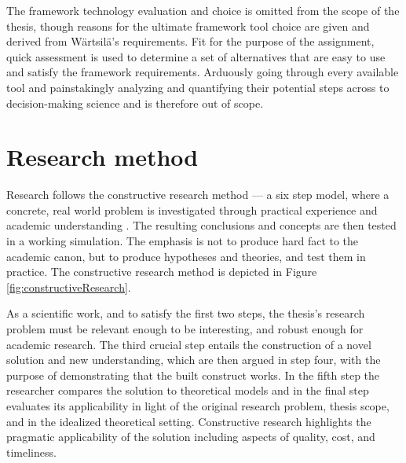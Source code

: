 \documentclass[12pt,a4paper,oneside,pdftex]{report}
\begin{document}
The framework technology evaluation and choice is omitted from the scope of the thesis, though reasons for the ultimate framework tool choice are given and derived from Wärtsilä's requirements. Fit for the purpose of the assignment, quick assessment is used to determine a set of alternatives that are easy to use and satisfy the framework requirements. Arduously going through every available tool and painstakingly analyzing and quantifying their potential steps across to decision-making science and is therefore out of scope. 


\section{Research method}
Research follows the constructive research method --- a six step model, where a concrete, real world problem is investigated through practical experience and academic understanding \citep{kasanen1993constructive, shaw2001research}. The resulting conclusions and concepts are then tested in a working simulation. The emphasis is not to produce hard fact to the academic canon, but to produce hypotheses and theories, and test them in practice. The constructive research method is depicted in Figure \ref{fig:constructiveResearch}.

As a scientific work, and to satisfy the first two steps, the thesis's research problem must be relevant enough to be interesting, and robust enough for academic research. The third crucial step entails the construction of a novel solution and new understanding, which are then argued in step four, with the purpose of demonstrating that the built construct works. In the fifth step the researcher compares the solution to theoretical models and in the final step evaluates its applicability in light of the original research problem, thesis scope, and in the idealized theoretical setting. Constructive research highlights the pragmatic applicability of the solution including aspects of quality, cost, and timeliness.
\end{document}
